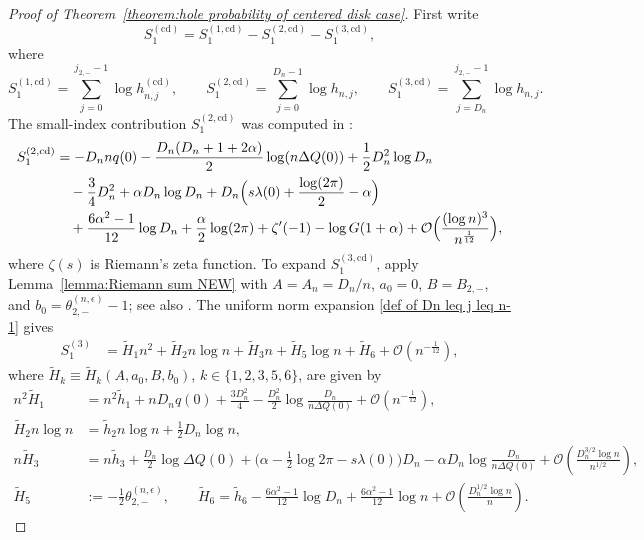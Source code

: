 \documentclass[a4paper]{article}
\numberwithin{equation}{section}
\begin{document}
\begin{proof}[Proof of Theorem~\ref{theorem:hole probability of centered disk case}]
First write
\[
    S_1^{(\mathrm{cd})}=S_1^{(1,\mathrm{cd})}-S_1^{(2,\mathrm{cd})}-S_1^{(3,\mathrm{cd})},
\]
where 
\[
    S_1^{(1,\mathrm{cd})}=\sum_{j=0}^{j_{2,-}-1}\log h_{n,j}^{(\mathrm{cd})},\qquad S_1^{(2,\mathrm{cd})}=\sum_{j=0}^{D_n-1}\log h_{n,j},\qquad
    S_1^{(3,\mathrm{cd})}=\sum_{j=D_n}^{j_{2,-}-1}\log h_{n,j}. 
\]
The small-index contribution $S_1^{(2,\mathrm{cd})}$ was computed in \cite[Lemma~4.2]{ACC2023c}:
\begin{align*}
S_1^{(2,\mathrm{cd})}&=-D_n nq(0)-\frac{D_n(D_n+1+2\alpha)}{2}\log (n\Delta Q(0))
+\frac{1}{2}D_n^2\log D_n
\\
&\quad -\frac{3}{4}D_n^2+\alpha D_n\log D_n
+D_n\Bigl(s\lambda(0)+\frac{\log (2\pi)}{2}-\alpha\Bigr)
\\
&\quad 
+\frac{6\alpha^2-1}{12}\log D_n+\frac{\alpha}{2}\log (2\pi)+\zeta'(-1)-\log G(1+\alpha)+\mathcal{O}\Bigl(\frac{(\log n)^3}{n^{\frac{1}{12}}}\Bigr), 
\end{align*}
where $\zeta(s)$ is Riemann's zeta function.
To expand $S_1^{(3,\mathrm{cd})}$, apply Lemma~\ref{lemma:Riemann sum NEW} with $A=A_n=D_n/n$, $a_0=0$, $B=B_{2,-}$, and $b_0=\theta_{2,-}^{(n,\epsilon)}-1$; see also \cite[Remark~3.5]{C2021}. The uniform norm expansion \eqref{def of Dn leq j leq n-1} gives
\begin{align*}
S_1^{(3)} & = \widetilde{H}_{1}n^2+\widetilde{H}_2n\log n+\widetilde{H}_3n+\widetilde{H}_5\log n+\widetilde{H}_6+\mathcal{O}(n^{-\frac{1}{12}}),  
\end{align*}
where $\widetilde H_k\equiv\widetilde H_k(A,a_0,B,b_0)$, $k\in\{1,2,3,5,6\}$, are given by
\begin{align*}
n^2\widetilde{H}_1
&=n^2\widetilde{h}_1
+nD_nq(0)+\frac{3D_n^2}{4}-\frac{D_n^2}{2}\log\frac{D_n}{n\Delta Q(0)}+\mathcal{O}(n^{-\frac{1}{12}}),
\\
\widetilde{H}_2n\log n&=
\widetilde{h}_2n\log n+\frac{1}{2}D_n\log n, 
\\
n\widetilde{H}_3&=
n\widetilde{h}_{3}
+\frac{D_n}{2}\log \Delta Q(0)
+\bigl(\alpha-\frac{1}{2}\log 2\pi-s\lambda(0)\bigr)D_n
-\alpha D_n\log\frac{D_n}{n\Delta Q(0)}
+\mathcal{O}(\frac{D_n^{3/2}\log n}{n^{1/2}}),
\\
\widetilde{H}_5&:=    
-\frac{1}{2}\theta_{2,-}^{(n,\epsilon)}, 
\qquad
\widetilde{H}_6=\widetilde{h}_6  
-\frac{6\alpha^2-1}{12}\log D_n
+\frac{6\alpha^2-1}{12}\log n
+\mathcal{O}(\frac{D_n^{1/2}\log n}{n}).
\end{align*}

\end{proof}
\end{document}
